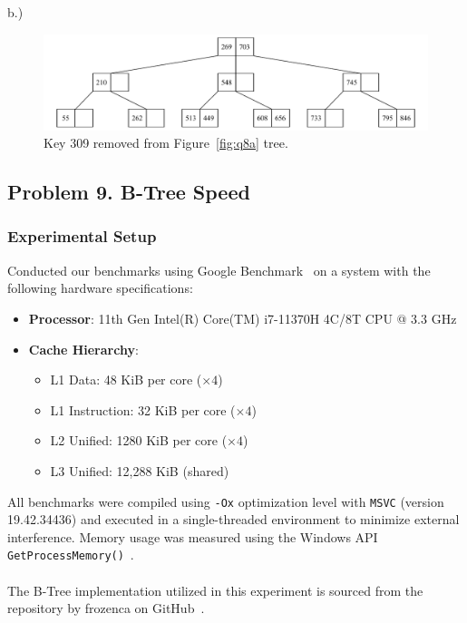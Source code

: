 \documentclass[12pt]{article}
\begin{document}
	
	b.) 
	\begin{figure}[H] 
		\centering
		\includegraphics[width=0.9\linewidth]{Q8_b.drawio}
		\caption{Key 309 removed from Figure~\ref{fig:q8a} tree.}
		\label{fig:q8b}
	\end{figure}
	
	
\vspace{2in} %

\pagebreak
\subsection*{Problem 9. B-Tree Speed}

\subsubsection*{Experimental Setup}
Conducted our benchmarks using Google Benchmark~\cite{google-bench} on a system with the following hardware specifications:

\begin{itemize}
	\item \textbf{Processor}: 11th Gen Intel(R) Core(TM) i7-11370H 4C/8T CPU @ 3.3 GHz
	\item \textbf{Cache Hierarchy}:
	\begin{itemize}
		\item L1 Data: 48 KiB per core (\(\times 4\))
		\item L1 Instruction: 32 KiB per core (\(\times 4\))
		\item L2 Unified: 1280 KiB per core (\(\times 4\))
		\item L3 Unified: 12,288 KiB (shared)
	\end{itemize}
\end{itemize}

All benchmarks were compiled using \texttt{-Ox} optimization level with \texttt{MSVC} (version 19.42.34436) and executed in a single-threaded environment to minimize external interference. Memory usage was measured using the Windows API \texttt{GetProcessMemory()}~\cite{getprocessmemoryinfo}.\\
\\
The B-Tree implementation utilized in this experiment is sourced from the repository by frozenca
on GitHub~\cite{btree_github}.
\end{document}
